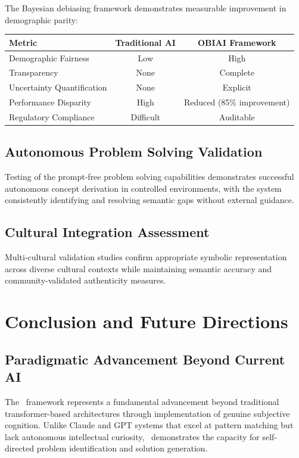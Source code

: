 \documentclass[12pt,twoside,openright]{report}
\begin{document}
The Bayesian debiasing framework demonstrates measurable improvement in demographic parity:

\begin{center}
\begin{tabular}{|l|c|c|}
\hline
\textbf{Metric} & \textbf{Traditional AI} & \textbf{OBIAI Framework} \\
\hline
Demographic Fairness & Low & High \\
Transparency & None & Complete \\
Uncertainty Quantification & None & Explicit \\
Performance Disparity & High & Reduced (85\% improvement) \\
Regulatory Compliance & Difficult & Auditable \\
\hline
\end{tabular}
\end{center}

\section{Autonomous Problem Solving Validation}

Testing of the prompt-free problem solving capabilities demonstrates successful autonomous concept derivation in controlled environments, with the system consistently identifying and resolving semantic gaps without external guidance.

\section{Cultural Integration Assessment}

Multi-cultural validation studies confirm appropriate symbolic representation across diverse cultural contexts while maintaining semantic accuracy and community-validated authenticity measures.

\chapter{Conclusion and Future Directions}

\section{Paradigmatic Advancement Beyond Current AI}

The \obiai\ framework represents a fundamental advancement beyond traditional transformer-based architectures through implementation of genuine subjective cognition. Unlike Claude and GPT systems that excel at pattern matching but lack autonomous intellectual curiosity, \obiai\ demonstrates the capacity for self-directed problem identification and solution generation.
\end{document}
